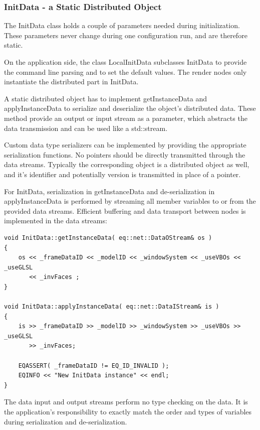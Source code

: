 \documentclass[10pt,a4]{scrartcl}
\begin{document}
\subsubsection{\label{sInitData}InitData - a Static Distributed Object}

The \textsf{InitData} class holds a couple of parameters needed during
initialization. These parameters never change during one configuration
run, and are therefore static.

On the application side, the class \textsf{LocalInitData} subclasses
\textsf{InitData} to provide the command line parsing and to set the
default values. The render nodes only instantiate the distributed part
in \textsf{InitData}.

A static distributed object has to implement \textsf{getInstanceData}
and \textsf{applyInstanceData} to serialize and deserialize the object's
distributed data. These method provide an output or input stream as a
parameter, which abstracts the data transmission and can be used like a
\textsf{std::stream}. 

Custom data type serializers can be implemented by providing the
appropriate serialization functions. No pointers should be directly
transmitted through the data streams. Typically the corresponding object
is a distributed object as well, and it's identifier and potentially
version is transmitted in place of a pointer.

For \textsf{InitData}, serialization in \textsf{getInstanceData}
and de-serialization in \textsf{applyInstanceData} is performed by
streaming all member variables to or from the provided data
streams. Efficient buffering and data transport between nodes is
implemented in the data streams:

{\footnotesize\begin{lstlisting}
void InitData::getInstanceData( eq::net::DataOStream& os )
{
    os << _frameDataID << _modelID << _windowSystem << _useVBOs << _useGLSL
       << _invFaces ;
}

void InitData::applyInstanceData( eq::net::DataIStream& is )
{
    is >> _frameDataID >> _modelID >> _windowSystem >> _useVBOs >> _useGLSL
       >> _invFaces;

    EQASSERT( _frameDataID != EQ_ID_INVALID );
    EQINFO << "New InitData instance" << endl;
}
\end{lstlisting}}%

The data input and output streams perform no type checking on the data.
It is the application's responsibility to exactly match the order and
types of variables during serialization and de-serialization.
\end{document}
